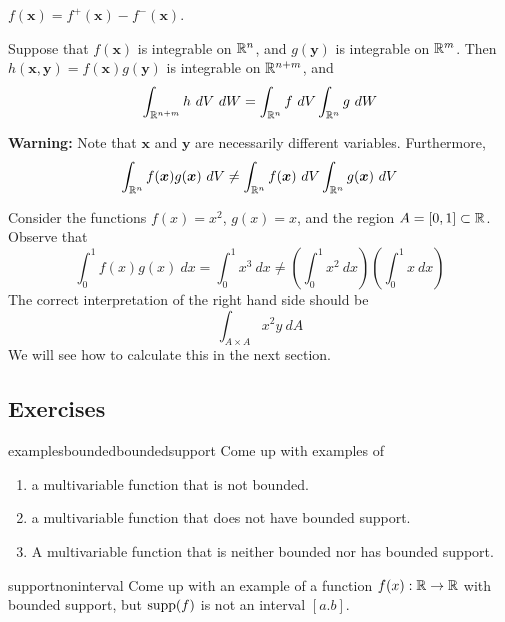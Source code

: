     \begin{proposition}
    $f(\bm{x}) = f^+(\bm{x}) - f^-(\bm{x})$.
    \end{proposition}


    \begin{proposition}
    Suppose that $f(\bm{x})$ is integrable on $\mathbb{R}^n$, and $g(\bm{y})$ is integrable on $\mathbb{R}^m$.  Then $h(\bm{x},\bm{y}) = f(\bm{x})g(\bm{y})$ is integrable on $\mathbb{R}^{n+m}$, and 
    $$\int_{\mathbb{R}^{n+m}} h \ dV \ dW = \int_{\mathbb{R}^n} f \ dV \int_{\mathbb{R}^n} g \ dW$$
    \end{proposition}
    
    \begin{remark}
        \textbf{Warning:} Note that $\bm{x}$ and $\bm{y}$ are necessarily different variables.  Furthermore, $$\int_{\mathbb{R}^{n}} f(\bm{x})g(\bm{x}) \ dV \neq \int_{\mathbb{R}^n} f(\bm{x}) \ dV \int_{\mathbb{R}^n} g(\bm{x}) \ dV$$
    \end{remark}

    \begin{example}
        Consider the functions $f(x) = x^2$, $g(x) = x$, and the region $A = [0,1] \subset \mathbb{R}$.  Observe that $$\int_0^1 f(x)g(x) \ dx = \int_0^1 x^3 \ dx \neq \left(\int_0^1 x^2 \ dx\right)\left(\int_0^1 x \ dx\right)$$
        The correct interpretation of the right hand side should be 
        $$\int_{A \times A} x^2y \ dA$$
        We will see how to calculate this in the next section.
    \end{example}
    
\subsection{Exercises}

\begin{problem}{examplesboundedboundedsupport}
Come up with examples of
       \begin{enumerate}
           \item a multivariable function that is not bounded.
           \item a multivariable function that does not have bounded support.
           \item A multivariable function that is neither bounded nor has bounded support.
       \end{enumerate}
\end{problem}

\begin{problem}{supportnoninterval}
    Come up with an example of a function $f(x) : \mathbb{R} \to \mathbb{R}$ with bounded support, but $\textnormal{supp}(f)$ is not an interval $[a.b]$.
\end{problem}

